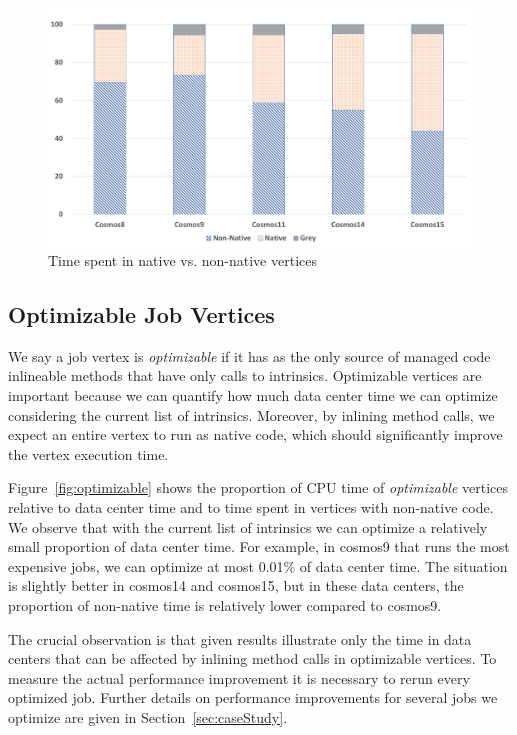 \begin{figure}[ht]
\includegraphics[width=2\columnwidth]{graphs/proportions.pdf}
\caption{Time spent in native vs. non-native vertices}
\label{fig:nativeVsNonNative}
\end{figure}

\subsection{Optimizable Job Vertices}


We say a job vertex is \emph{optimizable} if it has as the only source of managed code inlineable methods that have only calls to intrinsics. 
Optimizable vertices are important because we can quantify how much data center time we can optimize considering the current list of intrinsics. 
Moreover, by inlining method calls, we expect an entire vertex to run as native code, which should significantly improve the vertex execution time.

Figure~\ref{fig:optimizable} shows the proportion of CPU time of \emph{optimizable} vertices relative to data center time and to time spent in vertices with non-native code. 
We observe that with the current list of intrinsics we can optimize a relatively small proportion of data center time. 
For example, in cosmos9 that runs the most expensive jobs, we can optimize at most 0.01\% of data center time. 
The situation is slightly better in cosmos14 and cosmos15, but in these data centers, the proportion of non-native time is relatively lower compared to cosmos9.

The crucial observation is that given results illustrate only the time in data centers that can be affected by inlining method calls in optimizable vertices. 
To measure the actual performance improvement it is necessary to rerun every optimized job. 
Further details on performance improvements for several jobs we optimize are given in Section~\ref{sec:caseStudy}.

